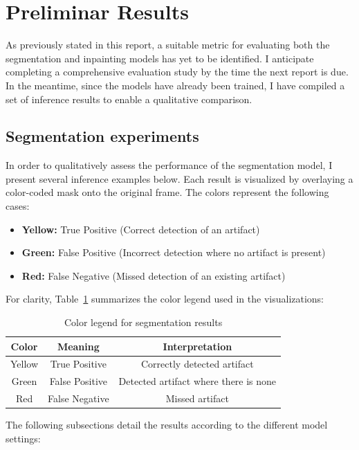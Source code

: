 \documentclass[openany, 12pt]{article}
\begin{document}
{\color{blue}
	\section{Preliminar Results}
	As previously stated in this report, a suitable metric for evaluating both the segmentation and inpainting models has yet to be identified. I anticipate completing a comprehensive evaluation study by the time the next report is due. In the meantime, since the models have already been trained, I have compiled a set of inference results to enable a qualitative comparison. 
	\subsection{Segmentation experiments}
	In order to qualitatively assess the performance of the segmentation model, I present several inference examples below. Each result is visualized by overlaying a color-coded mask onto the original frame. The colors represent the following cases:
	
	\begin{itemize} \item \textbf{Yellow:} True Positive (Correct detection of an artifact) \item \textbf{Green:} False Positive (Incorrect detection where no artifact is present) \item \textbf{Red:} False Negative (Missed detection of an existing artifact) \end{itemize}
	
	For clarity, Table~\ref{tab:legend} summarizes the color legend used in the visualizations:
	
\begin{table}[h]
	\centering
	\begin{tabular}{|c|c|c|}
		\hline
		\textbf{Color} & \textbf{Meaning} & \textbf{Interpretation} \\
		\hline
		\textcolor{groc}{Yellow} & True Positive & Correctly detected artifact \\
		\hline
		\textcolor{verd}{Green} & False Positive & Detected artifact where there is none \\
		\hline
		\textcolor{vermell}{Red} & False Negative & Missed artifact \\
		\hline
	\end{tabular}
	\caption{Color legend for segmentation results}
	\label{tab:legend}
\end{table}
The following subsections detail the results according to the different model settings:
}
\end{document}
